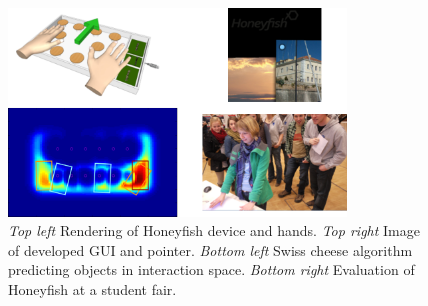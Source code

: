 \begin{figure}[ht]
\centering
\includegraphics[width=0.8\textwidth]{images/other_proto_honeyfish}
\caption{\emph{Top left} Rendering of Honeyfish device and hands. \emph{Top right} Image of developed GUI and pointer. \emph{Bottom left} Swiss cheese algorithm predicting objects in interaction space. \emph{Bottom right} Evaluation of Honeyfish at a student fair.}
\label{fig:other_proto_honeyfish}
\end{figure}

